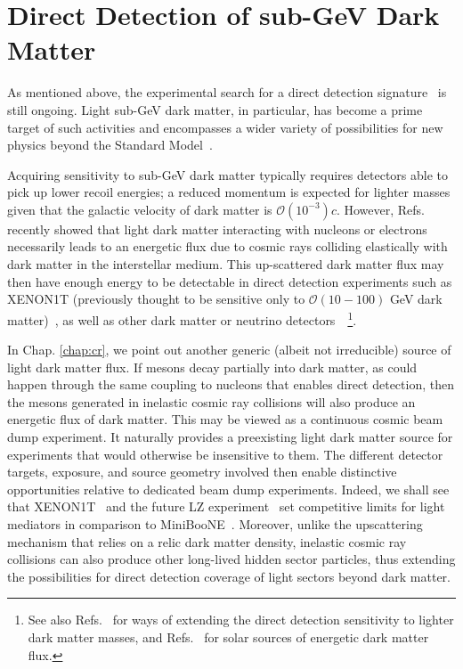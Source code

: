 \section{Direct Detection of sub-GeV Dark Matter}

As mentioned above, the experimental search for a direct detection signature~\cite{Goodman:1984dc} is still ongoing. Light sub-GeV dark matter, in particular, has become a prime target of such activities and encompasses a wider variety of possibilities for new physics beyond the Standard Model~\cite{Battaglieri:2017aum}.

Acquiring sensitivity to sub-GeV dark matter typically requires detectors able to pick up lower recoil energies; a reduced momentum is expected for lighter masses given that the galactic velocity of dark matter is $\mathcal{O}(10^{-3}) c$. However, Refs.~\cite{Bringmann:2018cvk, Ema:2018bih} recently showed that light dark matter interacting with nucleons or electrons necessarily leads to an energetic flux due to cosmic rays colliding elastically with dark matter in the interstellar medium. This up-scattered dark matter flux may then have enough energy to be detectable in direct detection experiments such as XENON1T (previously thought to be sensitive only to $\mathcal{O}(10-100)$ GeV dark matter)~\cite{Aprile:2018dbl}, as well as other dark matter or neutrino detectors~\cite{Bringmann:2018cvk, Ema:2018bih}~\footnote{See also Refs.~\cite{Kouvaris:2016afs, Ibe:2017yqa, Dolan:2017xbu} for ways of extending the direct detection sensitivity to lighter dark matter masses, and Refs.~\cite{Kouvaris:2015nsa,An:2017ojc,Emken:2017hnp} for solar sources of energetic dark matter flux.}.

In Chap. \ref{chap:cr}, we point out another generic (albeit not irreducible) source of light dark matter flux. If mesons decay partially into dark matter, as could happen through the same coupling to nucleons that enables direct detection, then the mesons generated in inelastic cosmic ray collisions will also produce an energetic flux of dark matter. This may be viewed as a continuous cosmic beam dump experiment. It naturally provides a preexisting light dark matter source for experiments that would otherwise be insensitive to them. The different detector targets, exposure, and source geometry involved then enable distinctive opportunities relative to dedicated beam dump experiments. Indeed, we shall see that XENON1T~\cite{Aprile:2018dbl} and the future LZ experiment~\cite{Akerib:2018lyp} set competitive limits for light mediators in comparison to MiniBooNE~\cite{Aguilar-Arevalo:2018wea}. Moreover, unlike the upscattering mechanism that relies on a relic dark matter density, inelastic cosmic ray collisions can also produce other long-lived hidden sector particles, thus extending the possibilities for direct detection coverage of light sectors beyond dark matter.


